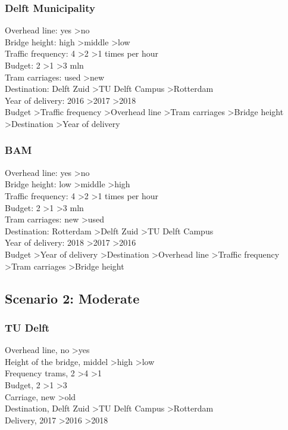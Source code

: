 \documentclass{article}
\begin{document}
\subsubsection*{Delft Municipality}
Overhead line: yes \textgreater no \\
Bridge height: high \textgreater middle \textgreater low \\
Traffic frequency: 4 \textgreater 2 \textgreater 1 times per hour \\
Budget: 2 \textgreater 1 \textgreater 3 mln \\
Tram carriages: used \textgreater new \\
Destination: Delft Zuid \textgreater TU Delft Campus \textgreater Rotterdam \\
Year of delivery: 2016 \textgreater 2017 \textgreater 2018 \\

Budget \textgreater Traffic frequency \textgreater Overhead line \textgreater Tram carriages \textgreater Bridge height \textgreater Destination \textgreater Year of delivery

\subsubsection*{BAM}
Overhead line: yes \textgreater no \\
Bridge height: low \textgreater middle \textgreater high \\
Traffic frequency: 4 \textgreater 2 \textgreater 1 times per hour \\
Budget: 2 \textgreater 1 \textgreater 3 mln \\
Tram carriages: new \textgreater used \\
Destination: Rotterdam \textgreater Delft Zuid \textgreater TU Delft Campus \\
Year of delivery: 2018 \textgreater 2017 \textgreater 2016 \\

Budget \textgreater Year of delivery \textgreater Destination \textgreater Overhead line \textgreater Traffic frequency \textgreater Tram carriages \textgreater Bridge height\\

\subsection{Scenario 2: Moderate}

\subsubsection*{TU Delft}
Overhead line, no \textgreater yes \\
Height of the bridge, middel  \textgreater high \textgreater low \\
Frequency trams, 2 \textgreater 4 \textgreater 1 \\
Budget, 2 \textgreater 1 \textgreater 3 \\
Carriage, new \textgreater old \\
Destination, Delft Zuid \textgreater TU Delft Campus \textgreater Rotterdam \\
Delivery, 2017 \textgreater 2016 \textgreater 2018 \\
\end{document}
